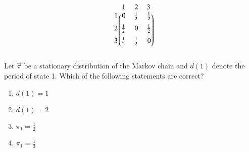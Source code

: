 \begin{enumerate}[label=\thesection.\arabic*.,ref=\thesection.\theenumi]
\begin{align}
\begin{blockarray}{c@{\hspace{1pt}}rrr@{\hspace{3pt}}}
            & 1   & 2 & 3 \\
        \begin{block}{r@{\hspace{3pt}}@{\hspace{1pt}}
    (@{\hspace{1pt}}rrr@{\hspace{1pt}}@{\hspace{1pt}})}
        1 &  0 & \frac{1}{2} & \frac{1}{2}   \\ [2mm]
        2 & \frac{1}{2}  & 0 & \frac{1}{2}\\ [2mm]
        3 & \frac{1}{2}  &  \frac{1}{2} & 0  \\ [2mm]
%
        \end{block}
    \end{blockarray}
\end{align}
%
Let $\vec{\pi}$ be a stationary distribution of the Markov chain and $d(1)$ denote the
period of state 1.  Which of the following statements are correct?
\begin{enumerate}
\item $d(1) = 1$
\item $d(1) = 2$
\item $\pi_1 = \frac{1}{2}$
\item $\pi_1 = \frac{1}{3}$
\end{enumerate}
\solution


\end{enumerate}

